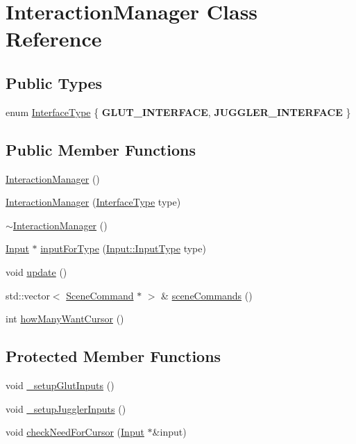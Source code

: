 \hypertarget{class_interaction_manager}{
\section{InteractionManager Class Reference}
\label{class_interaction_manager}
}
\subsection*{Public Types}
\begin{DoxyCompactItemize}
\item 
enum \hyperlink{class_interaction_manager_a8d6641e1266e7178e41427d3c266ec0a}{InterfaceType} \{ {\bfseries GLUT\_\-INTERFACE}, 
{\bfseries JUGGLER\_\-INTERFACE}
 \}
\end{DoxyCompactItemize}
\subsection*{Public Member Functions}
\begin{DoxyCompactItemize}
\item 
\hyperlink{class_interaction_manager_ad97c4651ffc8d746b7b99ee5cdc37d1d}{InteractionManager} ()
\item 
\hyperlink{class_interaction_manager_a2c0393088c9ac7d6f572acfe7b6c3fb9}{InteractionManager} (\hyperlink{class_interaction_manager_a8d6641e1266e7178e41427d3c266ec0a}{InterfaceType} type)
\item 
\hyperlink{class_interaction_manager_a362e8a2f2fba538df9c33a54ec49c2ef}{$\sim$InteractionManager} ()
\item 
\hyperlink{class_input}{Input} $\ast$ \hyperlink{class_interaction_manager_a5ea548125f01bdc57405680aed37a3c5}{inputForType} (\hyperlink{class_input_a5b3edc71e8f4aec47e2f44a492297cab}{Input::InputType} type)
\item 
void \hyperlink{class_interaction_manager_a5bcaa27707844164bc1ff79733b85055}{update} ()
\item 
std::vector$<$ \hyperlink{class_scene_command}{SceneCommand} $\ast$ $>$ \& \hyperlink{class_interaction_manager_a8476cf4690ddfabcf2cdc47dbde8c58a}{sceneCommands} ()
\item 
int \hyperlink{class_interaction_manager_a3ce3de15f8503235dbd7ee3b911e2c96}{howManyWantCursor} ()
\end{DoxyCompactItemize}
\subsection*{Protected Member Functions}
\begin{DoxyCompactItemize}
\item 
void \hyperlink{class_interaction_manager_ab20cc9048a4e327c482d5fad992670f6}{\_\-setupGlutInputs} ()
\item 
void \hyperlink{class_interaction_manager_ab3fae56ad6a2c3a09e5113271e7c7939}{\_\-setupJugglerInputs} ()
\item 
void \hyperlink{class_interaction_manager_a6cfbd6e78234b8bfd34fc88bd333fb3b}{checkNeedForCursor} (\hyperlink{class_input}{Input} $\ast$\&input)
\end{DoxyCompactItemize}
